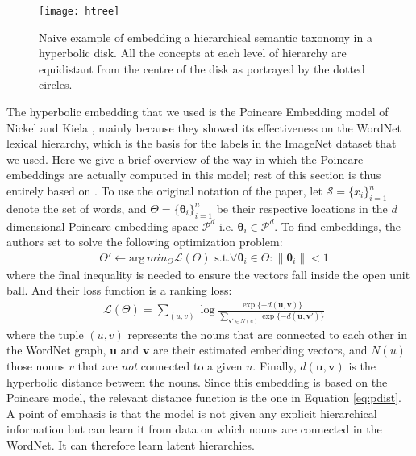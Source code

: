 \documentclass[12pt]{report}
\begin{document}
\begin{figure}
  \centering
  \texttt{[image: htree]}
	\caption{Naive example of embedding a hierarchical semantic taxonomy in a hyperbolic disk. All the concepts at each level of hierarchy are equidistant from the centre of the disk as portrayed by the dotted circles.}
  \label{fig:htree}
\end{figure}

The hyperbolic embedding that we used is the Poincare Embedding model of Nickel and Kiela \cite{Nickel2017}, mainly because they showed its effectiveness on the WordNet lexical hierarchy, which is the basis for the labels in the ImageNet dataset that we used. Here we give a brief overview of the way in which the Poincare embeddings are actually computed in this model; rest of this section is thus entirely based on \cite{Nickel2017}.  To use the original notation of the paper, let $\mathcal{S} = \{x_i\}_{i=1}^n$ denote the set of words, and $\Theta = \{\boldsymbol{\theta}_i\}_{i=1}^n$ be their respective locations in the $d$ dimensional Poincare embedding space $\mathcal{P}^d$ i.e. $\boldsymbol{\theta}_i \in \mathcal{P}^d$. To find embeddings, the authors set to solve the following optimization problem:
\begin{align*}
  &\Theta' \leftarrow \text{arg}\,min_{\Theta} \mathcal{L}\left(\Theta\right)\text{  s.t.} \forall \boldsymbol{\theta}_i \in \Theta : \lVert \boldsymbol{\theta}_i \rVert < 1
\end{align*}
where the final inequality is needed to ensure the vectors fall inside the open unit ball. And their loss function is a ranking loss:
\begin{align*}
  &\mathcal{L} \left(\Theta\right) = \sum_{(u,v)} \log \frac{\exp\{-d( \mathbf{u},\mathbf{v})\}}{\sum_{\mathbf{v'}\in N(u)}\exp\{-d(\mathbf{u},\mathbf{v'})\}}
\end{align*}
where the tuple $(u,v)$ represents the nouns that are connected to each other in the WordNet graph, $\mathbf{u}$ and $\mathbf{v}$ are their estimated embedding vectors, and $N(u)$ those nouns $v$ that are \textit{not} connected to a given $u$. Finally, $d(\mathbf{u}, \mathbf{v})$ is the hyperbolic distance between the nouns. Since this embedding is based on the Poincare model, the relevant distance function is the one in Equation \ref{eq:pdist}. A point of emphasis is that the model is not given any explicit hierarchical information but can learn it from data on which nouns are connected in the WordNet. It can therefore learn latent hierarchies. 
\end{document}
